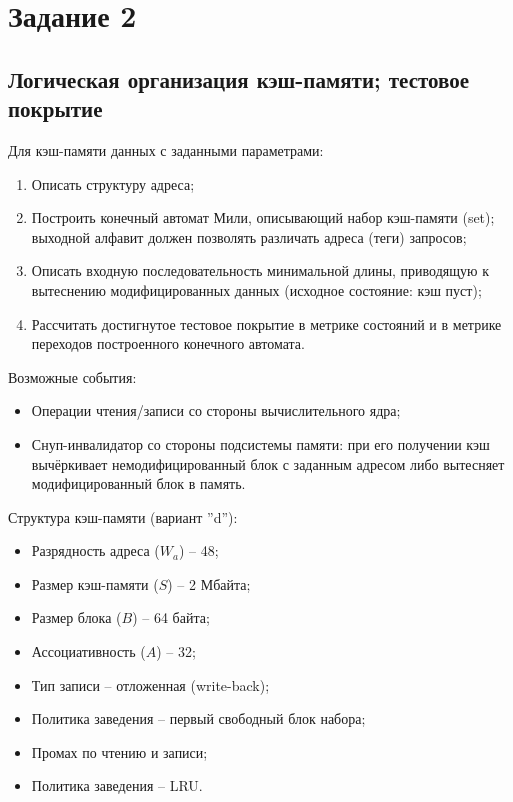 \section*{Задание 2}

\subsection*{Логическая организация кэш-памяти; тестовое покрытие}

Для кэш-памяти данных с заданными параметрами:

\begin{enumerate}
	\item Описать структуру адреса;
	\item Построить конечный автомат Мили, описывающий набор кэш-памяти (set); выходной алфавит должен позволять различать адреса (теги) запросов;
	\item Описать входную последовательность минимальной длины, приводящую к вытеснению модифицированных данных (исходное состояние: кэш пуст);
	\item Рассчитать достигнутое тестовое покрытие в метрике состояний и в метрике переходов построенного конечного автомата.
\end{enumerate}

Возможные события:

\begin{itemize}
	\item Операции чтения/записи со стороны вычислительного ядра;
	\item Снуп-инвалидатор со стороны подсистемы памяти: при его получении кэш вычёркивает немодифицированный блок с заданным адресом либо вытесняет модифицированный блок в память.
\end{itemize}

Структура кэш-памяти (вариант ''d''):

\begin{itemize}
	\item Разрядность адреса ($W_a$) -- 48;
	\item Размер кэш-памяти ($S$) -- 2 Мбайта;
	\item Размер блока ($B$) -- 64 байта;
	\item Ассоциативность ($A$) -- 32;
	\item Тип записи -- отложенная (write-back);
	\item Политика заведения -- первый свободный блок набора;
	\item Промах по чтению и записи;
	\item Политика заведения -- LRU.
\end{itemize}
